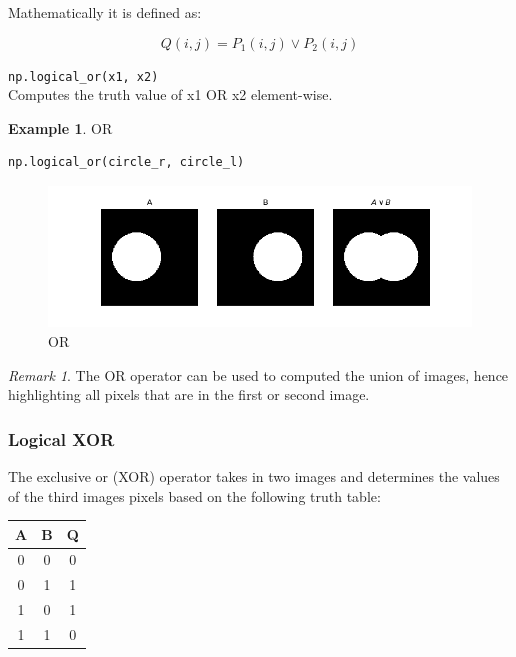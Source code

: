 \documentclass{article}
\theoremstyle{definition}
\newtheorem{ex}{Example}[subsection]
\theoremstyle{remark}
\newtheorem*{rem}{Remark}
\newcommand{\func}[2]{\noindent\lstinline{#1}\\#2}
\begin{document}
\noindent Mathematically it is defined as:

\begin{equation}
    Q(i,j) = P_1(i, j) \lor P_2(i, j) 
\end{equation}

\func{np.logical_or(x1, x2)}{Computes the truth value of x1 OR x2 element-wise.}

\begin{ex}OR
\begin{lstlisting}[language=Python]
np.logical_or(circle_r, circle_l)
\end{lstlisting}
\begin{figure}[H]
    \centering
    \includegraphics[width=\textwidth]{ocv_OR}
    \caption{OR}
    \label{fig:ocv_or}
\end{figure}
\end{ex}

\begin{rem}
    The OR operator can be used to computed the union of images, hence highlighting all pixels that are in the first or second image.
\end{rem}


\subsubsection{Logical XOR}


The exclusive or (XOR) operator takes in two images and determines the values of the third images pixels based on the following truth table:

\begin{table}[H]
    \centering
    \def\arraystretch{1.1}%
    \begin{tabular}{ c c c } 
	\hline
	A & B & Q \\
	\hline
	0 & 0 & 0 \\
	0 & 1 & 1 \\
	1 & 0 & 1 \\
	1 & 1 & 0 \\
	\hline
    \end{tabular}
\end{table}
\end{document}
